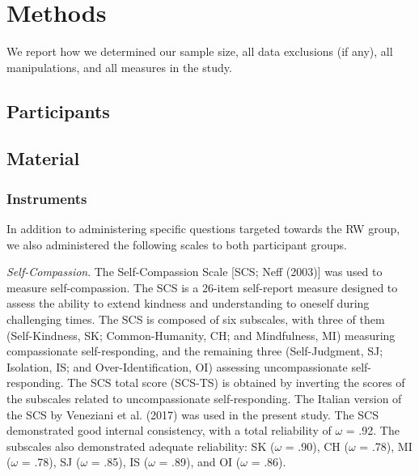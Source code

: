 \documentclass[
  man,floatsintext]{apa7}
\begin{document}
\hypertarget{methods}{%
\section{Methods}\label{methods}}

We report how we determined our sample size, all data exclusions (if any), all manipulations, and all measures in the study.

\hypertarget{participants}{%
\subsection{Participants}\label{participants}}

\hypertarget{material}{%
\subsection{Material}\label{material}}

\hypertarget{instruments}{%
\subsubsection{Instruments}\label{instruments}}

In addition to administering specific questions targeted towards the RW group, we also administered the following scales to both participant groups.

\emph{Self-Compassion}. The Self-Compassion Scale {[}SCS; Neff (2003){]} was used to measure self-compassion. The SCS is a 26-item self-report measure designed to assess the ability to extend kindness and understanding to oneself during challenging times. The SCS is composed of six subscales, with three of them (Self-Kindness, SK; Common-Humanity, CH; and Mindfulness, MI) measuring compassionate self-responding, and the remaining three (Self-Judgment, SJ; Isolation, IS; and Over-Identification, OI) assessing uncompassionate self-responding. The SCS total score (SCS-TS) is obtained by inverting the scores of the subscales related to uncompassionate self-responding. The Italian version of the SCS by Veneziani et al. (2017) was used in the present study. The SCS demonstrated good internal consistency, with a total reliability of \(\omega\) = .92. The subscales also demonstrated adequate reliability: SK (\(\omega\) = .90), CH (\(\omega\) = .78), MI (\(\omega\) = .78), SJ (\(\omega\) = .85), IS (\(\omega\) = .89), and OI (\(\omega\) = .86).
\end{document}
